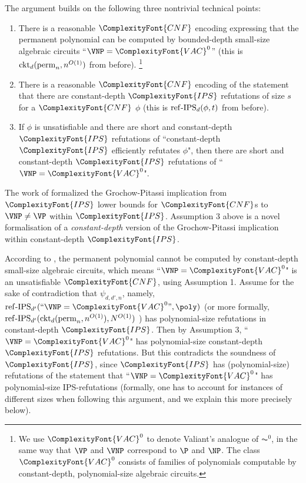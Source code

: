 \documentclass[11pt,letter]{article}
\theoremstyle{remark} %
\newcommand{\perm}{{\rm perm}}
\newcommand{\IPS}{%
    {
        \ComplexityFont{IPS} 
    }
}
\newcommand{\CNF}{ %
    {
        \ComplexityFont{CNF}
    }
}
\newcommand{\VAC}{
    {
        \ComplexityFont{VAC}
    }
}
\begin{document}
{The argument builds on the following three nontrivial technical points:
\begin{enumerate}
\item  There is a reasonable $\CNF$ encoding expressing that the permanent polynomial can be computed by bounded-depth small-size algebraic circuits ``$\VNP = \VAC^0$'' (this is %
    ${\rm ckt}_d(%
        \perm_n, n^{O(1)}%
                )%
    $ %
    from before).%
\footnote{We use $\VAC^0$ to denote Valiant’s analogue of $\AC^0$, in the same way that $\VP$ and $\VNP$ correspond to $\P$ and $\NP$. The class $\VAC^0$ consists of families of polynomials computable by constant-depth, polynomial-size algebraic circuits.}\vspace{-7pt}
\item  There is a reasonable $\CNF$ encoding of the statement that there are constant-depth $\IPS$ refutations of size $s$ for a $\CNF$ $\phi$ %
    (this is ${\rm ref\text{-}IPS}_{d}(\phi, t)$ from before).%
    \vspace{-7pt}
\item  If $\phi$ is unsatisfiable and there are short and constant-depth $\IPS$ refutations of ``constant-depth $\IPS$ efficiently refutates $\phi$", then there are short and constant-depth $\IPS$ refutations of ``$\VNP = \VAC^0$".
\label{it:intro:GP18-in-constant-depth}
\end{enumerate}

The work of \cite{ST25} formalized the Grochow-Pitassi implication from $\IPS$ lower bounds for $\CNF$s to $\VNP \neq \VP$ within $\IPS$. Assumption 3 above is a novel formalisation of a \textit{constant-depth} version of the Grochow-Pitassi implication within constant-depth $\IPS$. 

\newcommand{\ubb}{\ensuremath{\mathsf{ub}}}

\newcommand{\lbb}{\ensuremath{\mathsf{lb}}}

According to \cite{LST25}, the permanent polynomial cannot be computed by constant-depth  small-size algebraic circuits, which means ``$\VNP = \VAC^0$" is an unsatisfiable $\CNF$, using Assumption 1. Assume for the sake of contradiction that 
        $\psi_{d,d',n}$, namely, 
        $%
        {\rm ref\text{-}IPS}_{d'}%
        (%
                        ``\VNP = \VAC^0\text{''}, \poly
        )%
        $ %
(or more formally, 
        $%
        {\rm ref\text{-}IPS}_{d'}%
        ({\rm ckt}_d(%
                        \perm_n, n^{O(1)}
                    )%
        , N^{O(1)}%
        )%
        $ 
)
has polynomial-size refutations in constant-depth $\IPS$. Then by Assumption 3, ``$\VNP = \VAC^0$" has polynomial-size constant-depth $\IPS$ refutations. But this contradicts the soundness of $\IPS$, since $\IPS$ has (polynomial-size) refutations of the statement that ``$\VNP = \VAC^0$" has  polynomial-size IPS-refutations (formally, one has to account for instances of different sizes when following this argument, and we explain this more precisely below).
\smallskip

}
\end{document}

